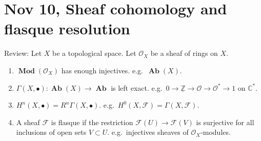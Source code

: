 \documentclass{amsart}
\numberwithin{equation}{section}
\theoremstyle{plain}
\theoremstyle{definition}
\newtheorem{prop}[equation]{Proposition}
\newtheorem{ww}[equation]{}
\DeclareMathOperator{\Ab}{\mathbf{Ab}}
\DeclareMathOperator{\Id}{Id}
\DeclareMathOperator{\Mod}{\mathbf{Mod}}
\begin{document}

%	
%	
%	
%	
%	
%	
%
\newpage
\section{Nov 10, Sheaf cohomology and flasque resolution}\label{2}

Review: Let $ X $ be a topological space. 
Let $ \mathcal O_X $ be a sheaf of rings on $ X $. 

\begin{enumerate}
	\item $ \Mod(\mathcal O_X) $ has enough injectives. e.g.~$ \Ab(X) $. 
	\item $ \Gamma(X, \bullet): \Ab(X)\to \Ab $ is left exact. e.g.~$ 0\to \underline{\mathbb Z}\to \mathcal O\to \mathcal O^*\to 1 $ on $ \mathbb C^* $. 
	\item $ H^n(X,\bullet)=R^n\Gamma(X, \bullet) $. e.g.~$ H^0(X, \mathscr F)=\Gamma(X, \mathscr F) $. 
	\item  A sheaf $ \mathscr F $ is flasque if the restriction $ \mathscr F(U)\to \mathscr F(V) $ is surjective for all inclusions of open sets $ V\subset U $. e.g.~injectives sheaves of $ \mathcal O_X $-modules. 
\end{enumerate}
\end{document}
